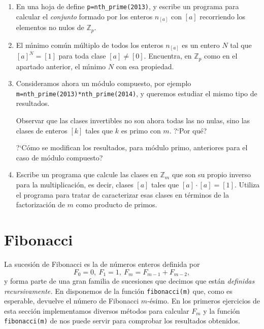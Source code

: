 \begin{ejer}
\begin{enumerate}
 \item En una hoja de {\sage} define \lstinline|p=nth_prime(2013)|, y escribe un
programa para calcular el {\itshape conjunto} formado por los enteros 
$n_{[a]}$ con $[a]$ recorriendo los elementos no nulos de $\mathbb{Z}_p$. 

\item El m\'{\i}nimo com\'un m\'ultiplo de todos los enteros $n_{[a]}$ es un
entero $N$ tal que $[a]^N=[1]$ para toda clase $[a]\ne [0].$  Encuentra, en
$\mathbb{Z}_p$ como en el apartado anterior, el m\'{\i}nimo $N$ con esa
propiedad. 


\item Consideramos ahora un m\'odulo compuesto, por ejemplo
\lstinline|m=nth_prime(2013)*nth_prime(2014)|, y queremos estudiar el mismo tipo
de resultados.

Observar que las clases invertibles no son ahora todas las no nulas, 
sino las clases de enteros
$[k]$ tales que $k$ es primo con $m$. ?`Por qu\'e? 	

?`C\'omo se modifican los resultados, para m\'odulo primo,  anteriores para el
caso
de m\'odulo compuesto?

\item Escribe un programa que calcule las clases en $\mathbb{Z}_m$  que son
su propio inverso para la multiplicaci\'on, es decir, clases $[a]$ tales que
$[a]\cdot [a]=[1]$.  Utiliza el programa para tratar de caracterizar esas clases
en t\'erminos de la factorizaci\'on de $m$ como producto de primos.



 
 \end{enumerate}
\end{ejer}

\section{Fibonacci}\label{fibon}

La sucesi\'on de Fibonacci es la de n\'umeros enteros  definida por
\[F_0=0,\ F_1=1,\ F_m=F_{m-1}+F_{m-2},\]
\noindent y forma parte de una gran familia de sucesiones que decimos que
est\'an {\itshape definidas recursivamente.} En {\sage} disponemos de la
funci\'on \lstinline|fibonacci(m)| que, como es esperable,  devuelve el n\'umero
de Fibonacci $m$-\'esimo.  En los primeros ejercicios de esta secci\'on
implementamos diversos m\'etodos para calcular $F_m$ y la funci\'on
\lstinline|fibonacci(m)| de {\sage} nos puede servir para comprobar los
resultados obtenidos. 


